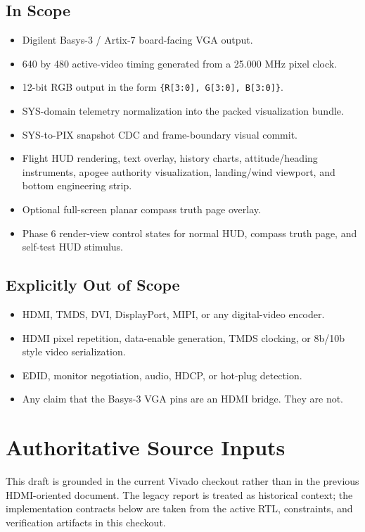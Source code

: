 \documentclass{article}
\newcommand{\sig}[1]{\begingroup\nolinkurl{#1}\endgroup}
\begin{document}
\subsection{In Scope}

\begin{itemize}
  \item Digilent Basys-3 / Artix-7 board-facing VGA output.
  \item 640 by 480 active-video timing generated from a 25.000 MHz pixel clock.
  \item 12-bit RGB output in the form \sig{\{R[3:0], G[3:0], B[3:0]\}}.
  \item SYS-domain telemetry normalization into the packed visualization bundle.
  \item SYS-to-PIX snapshot CDC and frame-boundary visual commit.
  \item Flight HUD rendering, text overlay, history charts, attitude/heading
        instruments, apogee authority visualization, landing/wind viewport, and
        bottom engineering strip.
  \item Optional full-screen planar compass truth page overlay.
  \item Phase 6 render-view control states for normal HUD, compass truth page,
        and self-test HUD stimulus.
\end{itemize}

\subsection{Explicitly Out of Scope}

\begin{itemize}
  \item HDMI, TMDS, DVI, DisplayPort, MIPI, or any digital-video encoder.
  \item HDMI pixel repetition, data-enable generation, TMDS clocking, or 8b/10b
        style video serialization.
  \item EDID, monitor negotiation, audio, HDCP, or hot-plug detection.
  \item Any claim that the Basys-3 VGA pins are an HDMI bridge.  They are not.
\end{itemize}

\section{Authoritative Source Inputs}

This draft is grounded in the current Vivado checkout rather than in the
previous HDMI-oriented document.  The legacy report is treated as historical
context; the implementation contracts below are taken from the active RTL,
constraints, and verification artifacts in this checkout.
\end{document}
